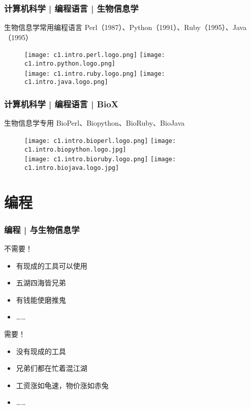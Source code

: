 \begin{frame}
  \frametitle{计算机科学 | 编程语言 | 生物信息学}
  \begin{block}{\alert{生物信息学常用编程语言}}
    Perl（1987）、Python（1991）、Ruby（1995）、Java（1995）
  \end{block}
  \begin{figure}
    \centering
    \texttt{[image: c1.intro.perl.logo.png]}
    \hspace{2em}
    \texttt{[image: c1.intro.python.logo.png]}\\
    \texttt{[image: c1.intro.ruby.logo.png]}
    \hspace{11em}
    \texttt{[image: c1.intro.java.logo.png]}
  \end{figure}
\end{frame}

\begin{frame}
  \frametitle{计算机科学 | 编程语言 | BioX}
  \begin{block}{\alert{生物信息学专用}}
    BioPerl、Biopython、BioRuby、BioJava
  \end{block}
  \begin{figure}
    \centering
    \texttt{[image: c1.intro.bioperl.logo.png]}
    \hspace{2em}
    \texttt{[image: c1.intro.biopython.logo.jpg]}\\
    \texttt{[image: c1.intro.bioruby.logo.png]}
    \hspace{10em}
    \texttt{[image: c1.intro.biojava.logo.jpg]}
  \end{figure}
\end{frame}

\section{编程}
\begin{frame}
  \frametitle{编程 | 与生物信息学}
  \begin{block}{不需要！}
    \begin{itemize}
      \item 有现成的工具可以使用
      \item 五湖四海皆兄弟
      \item 有钱能使磨推鬼
      \item ……
    \end{itemize}
  \end{block}
  \pause
  \begin{block}{需要！}
    \begin{itemize}
      \item 没有现成的工具
      \item 兄弟们都在忙着混江湖
      \item 工资涨如龟速，物价涨如赤兔
      \item ……
    \end{itemize}
  \end{block}
\end{frame}

